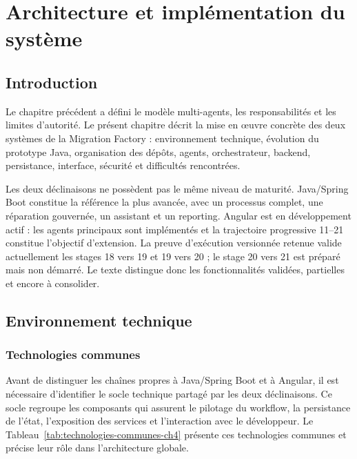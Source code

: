\chapter{Architecture et implémentation du système}

\section*{Introduction}

Le chapitre précédent a défini le modèle multi-agents, les responsabilités et les limites d'autorité. Le présent chapitre décrit la mise en œuvre concrète des deux systèmes de la Migration Factory : environnement technique, évolution du prototype Java, organisation des dépôts, agents, orchestrateur, backend, persistance, interface, sécurité et difficultés rencontrées.

Les deux déclinaisons ne possèdent pas le même niveau de maturité. Java/Spring Boot constitue la référence la plus avancée, avec un processus complet, une réparation gouvernée, un assistant et un reporting. Angular est en développement actif : les agents principaux sont implémentés et la trajectoire progressive 11--21 constitue l'objectif d'extension. La preuve d'exécution versionnée retenue valide actuellement les stages 18 vers 19 et 19 vers 20 ; le stage 20 vers 21 est préparé mais non démarré. Le texte distingue donc les fonctionnalités validées, partielles et encore à consolider.

\section{Environnement technique}

\subsection{Technologies communes}

Avant de distinguer les chaînes propres à Java/Spring Boot et à Angular, il est nécessaire d'identifier le socle technique partagé par les deux déclinaisons. Ce socle regroupe les composants qui assurent le pilotage du workflow, la persistance de l'état, l'exposition des services et l'interaction avec le développeur. Le Tableau~\ref{tab:technologies-communes-ch4} présente ces technologies communes et précise leur rôle dans l'architecture globale.

